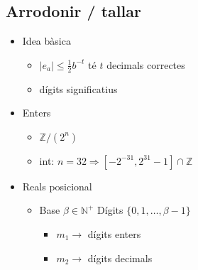 \documentclass{article}
\newcommand{\N}{\mathbb{N}}
\newcommand{\Z}{\mathbb{Z}}
\begin{document}
\subsection{Arrodonir / tallar}
\begin{itemize}
\item Idea bàsica
	\begin{itemize}
	\item $|e_a| \le \frac{1}{2} b^{-t}$ té $t$ decimals correctes
	\item dígits significatius
	\end{itemize}

\item Enters
	\begin{itemize}
	\item $\Z/(2^n)$
	\item int: $n = 32 \Rightarrow [-2^{-31}, 2^{31} -1] \cap \Z$
	\end{itemize}

\item Reals posicional
	\begin{itemize}
	\item Base $\beta \in \N^+$
		\subitem Dígits $\{0, 1, \dots , \beta -1\}$
		\begin{itemize}
		\item $m_1 \to$ dígits enters
		\item $m_2 \to$ dígits decimals
		\end{itemize}
	\end{itemize}


\end{itemize}
\end{document}
